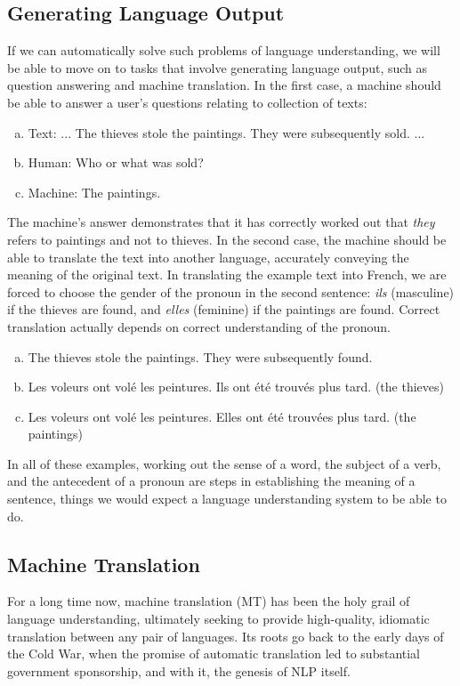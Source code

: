 \subsection{Generating Language Output}
If we can automatically solve such problems of language understanding, we will be able to move on to tasks that involve generating language output, such as question answering and machine translation. In the first case, a machine should be able to answer a user's questions relating to collection of texts:
\begin{enumerate}[a.]
    \item Text: ... The thieves stole the paintings. They were subsequently sold. ...
    \item Human: Who or what was sold?
    \item Machine: The paintings.
\end{enumerate}
The machine's answer demonstrates that it has correctly worked out that \emph{they} refers to paintings and not to thieves. In the second case, the machine should be able to translate the text into another language, accurately conveying the meaning of the original text. In translating the example text into French, we are forced to choose the gender of the pronoun in the second sentence: \emph{ils} (masculine) if the thieves are found, and \emph{elles} (feminine) if the paintings are found. Correct translation actually depends on correct understanding of the pronoun.
\begin{enumerate}[a.]
    \item The thieves stole the paintings. They were subsequently found.
    \item Les voleurs ont volé les peintures. Ils ont été trouvés plus tard. (the thieves)
    \item Les voleurs ont volé les peintures. Elles ont été trouvées plus tard. (the paintings)
\end{enumerate}
In all of these examples, working out the sense of a word, the subject of a verb, and the antecedent of a pronoun are steps in establishing the meaning of a sentence, things we would expect a language understanding system to be able to do.
\subsection{Machine Translation}
For a long time now, machine translation (MT) has been the holy grail of language understanding, ultimately seeking to provide high-quality, idiomatic translation between any pair of languages. Its roots go back to the early days of the Cold War, when the promise of automatic translation led to substantial government sponsorship, and with it, the genesis of NLP itself.

